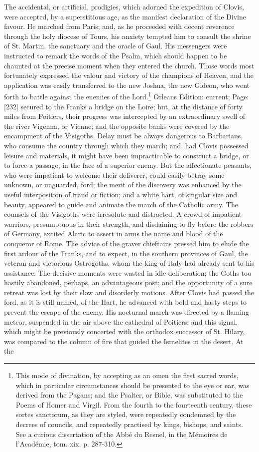 The accidental, or artificial, prodigies, which adorned the expedition of Clovis, were accepted, by a superstitious age, as the manifest declaration of the Divine favour. He marched from Paris; and, as he proceeded with decent reverence through the holy diocese of Tours, his anxiety tempted him to consult the shrine of St. Martin, the sanctuary and the oracle of Gaul. His messengers were instructed to remark the words of the Psalm, which should happen to be chaunted at the precise moment when they entered the church. Those words most fortunately expressed the valour and victory of the champions of Heaven, and the application was easily transferred to the new Joshua, the new Gideon, who went forth to battle against the enemies of the Lord.\footnote{This mode of divination, by accepting as an omen the first sacred words, which in particular circumstances should be presented to the eye or ear, was derived from the Pagans; and the Psalter, or Bible, was substituted to the Poems of Homer and Virgil. From the fourth to the fourteenth century, these sortes sanctorum, as they are styled, were repeatedly condemned by the decrees of councils, and repeatedly practised by kings, bishops, and saints. See a curious dissertation of the Abbé du Resnel, in the Mémoires de l\texthebrew{}’Académie, tom. xix. p. 287-310.} Orleans Edition: current; Page: [232] secured to the Franks a bridge on the Loire; but, at the distance of forty miles from Poitiers, their progress was intercepted by an extraordinary swell of the river Vigenna, or Vienne; and the opposite banks were covered by the encampment of the Visigoths. Delay must be always dangerous to Barbarians, who consume the country through which they march; and, had Clovis possessed leisure and materials, it might have been impracticable to construct a bridge, or to force a passage, in the face of a superior enemy. But the affectionate peasants, who were impatient to welcome their deliverer, could easily betray some unknown, or unguarded, ford; the merit of the discovery was enhanced by the useful interposition of fraud or fiction; and a white hart, of singular size and beauty, appeared to guide and animate the march of the Catholic army. The counsels of the Visigoths were irresolute and distracted. A crowd of impatient warriors, presumptuous in their strength, and disdaining to fly before the robbers of Germany, excited Alaric to assert in arms the name and blood of the conqueror of Rome. The advice of the graver chieftains pressed him to elude the first ardour of the Franks, and to expect, in the southern provinces of Gaul, the veteran and victorious Ostrogoths, whom the king of Italy had already sent to his assistance. The decisive moments were wasted in idle deliberation; the Goths too hastily abandoned, perhaps, an advantageous post; and the opportunity of a sure retreat was lost by their slow and disorderly motions. After Clovis had passed the ford, as it is still named, of the Hart, he advanced with bold and hasty steps to prevent the escape of the enemy. His nocturnal march was directed by a flaming meteor, suspended in the air above the cathedral of Poitiers; and this signal, which might be previously concerted with the orthodox successor of St. Hilary, was compared to the column of fire that guided the Israelites in the desert. At the 